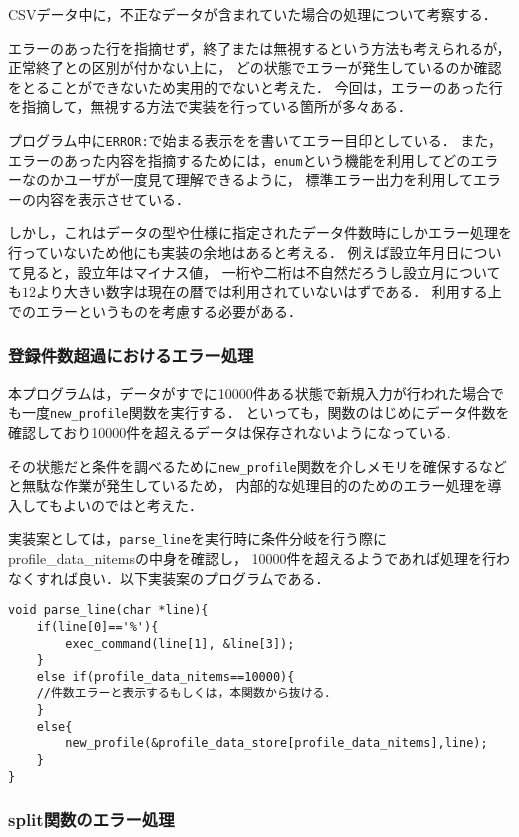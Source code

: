 \documentclass[a4j,11pt]{jarticle}
\begin{document}
CSVデータ中に，不正なデータが含まれていた場合の処理について考察する．

エラーのあった行を指摘せず，終了または無視するという方法も考えられるが，正常終了との区別が付かない上に，
どの状態でエラーが発生しているのか確認をとることができないため実用的でないと考えた．
今回は，エラーのあった行を指摘して，無視する方法で実装を行っている箇所が多々ある．

プログラム中に\verb|ERROR:|で始まる表示をを書いてエラー目印としている．
また，エラーのあった内容を指摘するためには，\verb|enum|という機能を利用してどのエラーなのかユーザが一度見て理解できるように，
標準エラー出力を利用してエラーの内容を表示させている．

しかし，これはデータの型や仕様に指定されたデータ件数時にしかエラー処理を行っていないため他にも実装の余地はあると考える．
例えば設立年月日について見ると，設立年はマイナス値，
一桁や二桁は不自然だろうし設立月についても$12$より大きい数字は現在の暦では利用されていないはずである．
利用する上でのエラーというものを考慮する必要がある．

\subsubsection{登録件数超過におけるエラー処理}
本プログラムは，データがすでに10000件ある状態で新規入力が行われた場合でも一度\verb|new_profile|関数を実行する．
といっても，関数のはじめにデータ件数を確認しており10000件を超えるデータは保存されないようになっている.

その状態だと条件を調べるために\verb|new_profile|関数を介しメモリを確保するなどと無駄な作業が発生しているため，
内部的な処理目的のためのエラー処理を導入してもよいのではと考えた．

実装案としては，\verb|parse_line|を実行時に条件分岐を行う際にprofile\_data\_nitemsの中身を確認し，
10000件を超えるようであれば処理を行わなくすれば良い．以下実装案のプログラムである．
\begin{verbatim}
void parse_line(char *line){
    if(line[0]=='%'){
        exec_command(line[1], &line[3]);
    }
    else if(profile_data_nitems==10000){
    //件数エラーと表示するもしくは，本関数から抜ける．
    }
    else{
        new_profile(&profile_data_store[profile_data_nitems],line);
    }
}
\end{verbatim}
\subsubsection{split関数のエラー処理}
\end{document}
